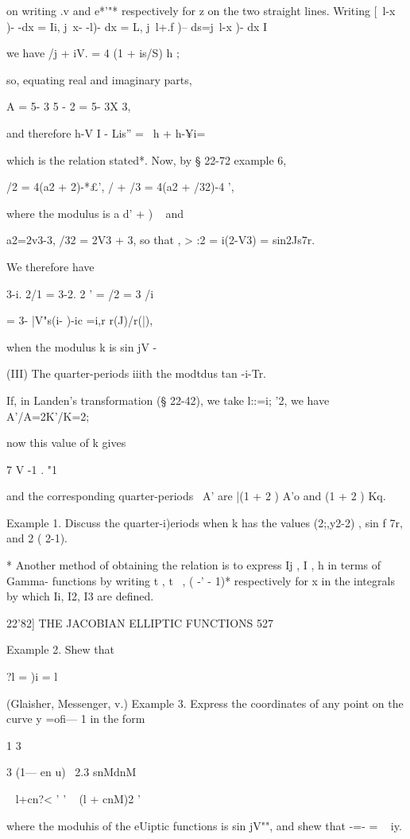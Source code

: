 on writing .v and e*'"* respectively for z on the two straight lines.
Writing [\ l-x )- -dx = Ii, j\ x- -l)- dx = L, j\ l+.f )-- ds=j\ l-x
)- dx I

we have /j + iV. = 4 (1 + is/S) h ;

so, equating real and imaginary parts,

A = 5- 3 5 - 2 = 5- 3X 3,

and therefore h-V I - Lis'' = \ h + h-¥i=

which is the relation stated*. Now, by § 22-72 example 6,

/2 = 4(a2 + 2)-*£', / + /3 = 4(a2 + /32)-4 ',

where the modulus is a d' + ) ~ and

a2=2v3-3, /32 = 2V3 + 3, so that , > :2 = i(2-V3) = sin2Js7r.

We therefore have

3-i. 2/1 = 3-2. 2 ' = /2 = 3 /i

= 3- |V"s(i- )-ic =i,r r(J)/r(|),

when the modulus k is sin jV -

(III) The quarter-periods iiith the modtdus tan -i-Tr.

If, in Landen's transformation (§ 22-42), we take l::=i; '2, we have
A'/A=2K'/K=2;

now this value of k gives

7 V -1 . "1

and the corresponding quarter-periods \, A' are |(1 + 2 ) A'o and (1 +
2 ) Kq.

Example 1. Discuss the quarter-i)eriods when k has the values
(2;,y2-2) , sin f 7r, and 2 ( 2-1).

* Another method of obtaining the relation is to express Ij , I , h in
terms of Gamma- functions by writing t , t~ , ( -' - 1)* respectively
for x in the integrals by which Ii, I2, I3 are defined.

22'82] THE JACOBIAN ELLIPTIC FUNCTIONS 527

Example 2. Shew that

?l = )i = l

(Glaisher, Messenger, v.) Example 3. Express the coordinates of any
point on the curve y =ofi— 1 in the form

1 3

3 (1— en u) \ 2.3 snMdnM

 ~ l+cn?< ' ' ~ (l + cnM)2 '

where the moduhis of the eUiptic functions is sin jV"", and shew that
-=- = ~ iy.

